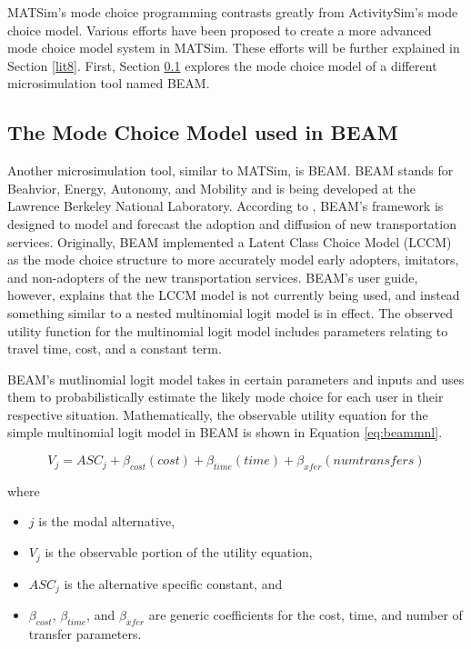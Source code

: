 \documentclass[3p, authoryear, review]{elsarticle} %
\providecommand{\tightlist}{%
  \setlength{\itemsep}{0pt}\setlength{\parskip}{0pt}}
\begin{document}
MATSim's mode choice programming contrasts greatly from ActivitySim's mode choice model. Various efforts have been proposed to create a more advanced mode choice model system in MATSim. These efforts will be further explained in Section \ref{lit8}. First, Section \ref{lit7} explores the mode choice model of a different microsimulation tool named BEAM.

\hypertarget{lit7}{%
\subsection{The Mode Choice Model used in BEAM}\label{lit7}}

Another microsimulation tool, similar to MATSim, is BEAM. BEAM stands for Beahvior, Energy, Autonomy, and Mobility and is being developed at the Lawrence Berkeley National Laboratory. According to \citet{zarwi17}, BEAM's framework is designed to model and forecast the adoption and diffusion of new transportation services. Originally, BEAM implemented a Latent Class Choice Model (LCCM) as the mode choice structure to more accurately model early adopters, imitators, and non-adopters of the new transportation services. BEAM's user guide, however, explains that the LCCM model is not currently being used, and instead something similar to a nested multinomial logit model is in effect. The observed utility function for the multinomial logit model includes parameters relating to travel time, cost, and a constant term.

BEAM's mutlinomial logit model takes in certain parameters and inputs and uses them to probabilistically estimate the likely mode choice for each user in their respective situation. Mathematically, the observable utility equation for the simple multinomial logit model in BEAM is shown in Equation \eqref{eq:beammnl}.

\begin{equation}
  V_j = ASC_j + \beta_{cost}(cost) + \beta_{time}(time) + \beta_{xfer}(numtransfers) 
    \label{eq:beammnl}
\end{equation}

where

\begin{itemize}
\tightlist
\item
  \(j\) is the modal alternative,
\item
  \(V_j\) is the observable portion of the utility equation,
\item
  \(ASC_j\) is the alternative specific constant, and
\item
  \(\beta_{cost}\), \(\beta_{time}\), and \(\beta_{xfer}\) are generic coefficients for the cost, time, and number of transfer parameters.
\end{itemize}
\end{document}
